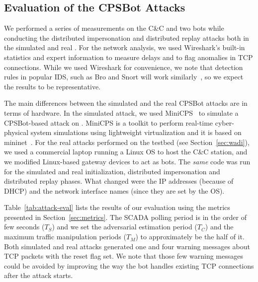 \documentclass[sigconf]{acmart}
\makeatletter
\newcommand{\Botnet}{CPSBot\@\xspace}
\newcommand{\CC}{C\&C\@\xspace}
\makeatother
\begin{document}
\subsection{Evaluation of the \Botnet Attacks}
\label{sec:evaluation}


We performed a series of measurements on the \CC and two bots while conducting
the distributed impersonation and distributed replay attacks both in
the simulated and real \wadilong. For the network analysis, we used
Wireshark's built-in statistics and expert information to measure delays and
to flag anomalies in TCP connections. While we used Wireshark for convenience,
we note that detection rules in popular IDS, such as Bro and Snort will
work similarly~\cite{sanders2017practical}, so we expect the results to be
representative.

The main differences between the simulated and the real \Botnet
attacks are in terms of hardware. In the simulated attack, we used
MiniCPS~\cite{antonioli2015minicps} to simulate a \Botnet-based attack on
\wadilong. MiniCPS is a toolkit to perform real-time
cyber-physical system simulations using lightweight virtualization and it is based
on mininet~\cite{team2012mininet}. For the real attacks performed on the
\wadilong testbed (see Section~\ref{sec:wadi}), we used a commercial laptop running a
Linux OS to host the \CC station, and we modified Linux-based gateway
devices to act as bots. The \emph{same} code was run for the simulated and
real initialization, distributed impersonation and distributed replay phases.
What changed were the IP addresses (because of DHCP) and
the network interface names (since they are set by the OS).

Table~\ref{tab:attack-eval} lists the results of our evaluation using the
metrics presented in Section~\ref{sec:metrics}. The SCADA polling period is in
the order of few seconds ($T_S$) and we set the adversarial estimation period
($T_C$) and the maximum traffic manipulation periods ($T_M$) to approximately
be the half of it. Both simulated and real attacks generated one and four warning
messages about TCP packets with the reset flag set. We note that those few
warning messages could be avoided by improving the way the bot handles
existing TCP connections after the attack starts.
\end{document}

